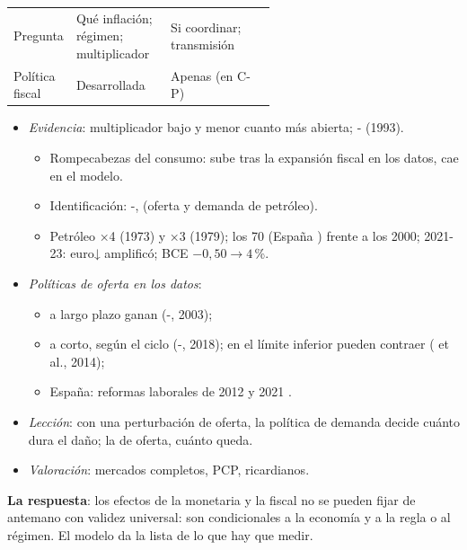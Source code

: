 \documentclass{article}
\begin{document}
\begin{columnas}
{\begin{tabularx}{\linewidth}{>{\raggedright\arraybackslash}p{0.22\linewidth}>{\raggedright\arraybackslash}p{0.36\linewidth}>{\raggedright\arraybackslash}X}
Pregunta & Qué inflación; régimen; multiplicador & Si coordinar; transmisión\\
\rowcolor{tceesalvia}Política fiscal & Desarrollada & Apenas (en C-P)\\
\bottomrule
\end{tabularx}}
\begin{itemize}
\item \emph{Evidencia}: multiplicador bajo y menor cuanto más abierta; - (1993).
  \begin{itemize}
  \item Rompecabezas del consumo: sube tras la expansión fiscal en los datos, cae en el modelo.
  \item Identificación: -,  (oferta y demanda de petróleo).
  \item Petróleo ×4 (1973) y ×3 (1979); los 70 (España ) frente a los 2000; 2021-23: euro↓ amplificó; BCE $-0{,}50\to4$\,\%.
  \end{itemize}
\item \emph{Políticas de oferta en los datos}:
  \begin{itemize}
  \item a largo plazo ganan (-, 2003);
  \item a corto, según el ciclo (-, 2018); en el límite inferior pueden contraer ( et al., 2014);
  \item España: reformas laborales de 2012 y 2021 .
  \end{itemize}
\item \emph{Lección}: con una perturbación de oferta, la política de demanda decide cuánto dura el daño; la de oferta, cuánto queda.
\item \emph{Valoración}: mercados completos, PCP, ricardianos.
\end{itemize}
\begin{ideaclave}
\textbf{La respuesta}: los efectos de la monetaria y la fiscal no se pueden fijar de antemano con validez universal: son condicionales a la economía y a la regla o al régimen. El modelo da la lista de lo que hay que medir.
\end{ideaclave}


\end{columnas}
\end{document}

